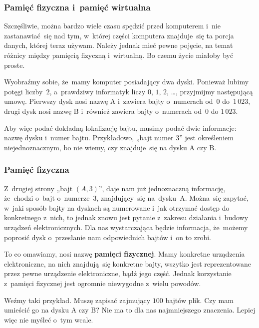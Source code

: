 \documentclass[10pt,t]{beamer}
\begin{document}
\begin{frame}
  \frametitle{Pamięć fizyczna i~pamięć wirtualna}


  Szczęśliwie, można bardzo wiele czasu spędzić przed komputerem i~nie
  zastanawiać~się nad tym, w~której części komputera znajduje~się ta porcja
  danych, której teraz używam. Należy jednak mieć pewne pojęcie, na temat
  różnicy między pamięcią fizyczną i~wirtualną. Bo czemu życie miałoby być
  proste.

  Wyobraźmy sobie, że~mamy komputer posiadający dwa dyski. Ponieważ lubimy
  potęgi liczby~$2$, a~prawdziwy informatyk liczy $0$, $1$, $2$, \ldots,
  przyjmijmy następującą umowę. Pierwszy dysk nosi nazwę $\text{A}$
  i~zawiera bajty o~numerach od~$0$ do~$1 \, 023$, drugi dysk nosi nazwę
  $\text{B}$ i~również zawiera bajty o~numerach od~$0$ do $1 \, 023$.

  Aby więc podać dokładną lokalizację bajtu, musimy podać dwie informacje:
  nazwę dysku i~numer bajtu. Przykładowo, „bajt numer $3$” jest określeniem
  niejednoznacznym, bo nie wiemy, czy znajduje~się na dysku $\text{A}$
  czy $\text{B}$.

\end{frame}





\begin{frame}
  \frametitle{Pamięć fizyczna}


  Z~drugiej strony „bajt $( A, 3 )$”, daje nam już jednoznaczną informację,
  że~chodzi o~bajt o~numerze~$3$, znajdujący~się na~dysku~$\text{A}$.
  Można~się zapytać, w~jaki sposób bajty na dyskach są numerowane i~jak
  otrzymać dostęp do konkretnego z~nich, to jednak znowu jest pytanie
  z~zakresu działania i~budowy urządzeń elektronicznych. Dla nas
  wystarczająca będzie informacja, że~możemy poprosić dysk o~przesłanie nam
  odpowiednich bajtów i~on to zrobi.

  To co omawiamy, nosi nazwę \textbf{pamięci fizycznej}. Mamy konkretne
  urządzenia elektroniczne, na nich znajdują~się konkretne bajty, wszytko
  jest reprezentowane przez pewne urządzenie elektroniczne, bądź jego część.
  Jednak korzystanie z~pamięci fizycznej jest ogromnie niewygodne z~wielu
  powodów.

  Weźmy taki przykład. Muszę zapisać zajmujący $100$ bajtów plik. Czy mam
  umieścić go na dysku $\text{A}$ czy $\text{B}$? Nie ma to dla nas
  najmniejszego znaczenia. Lepiej więc nie myśleć o~tym wcale.

\end{frame}
\end{document}
